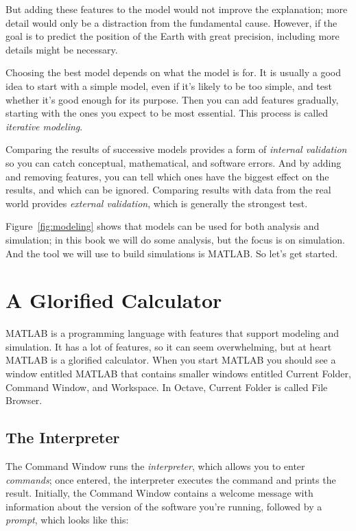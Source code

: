 But adding these features to the model would not improve the explanation; more detail would only be a distraction from the fundamental cause.  However, if the goal is to predict the position of the Earth with great precision, including more details might be necessary.

Choosing the best model depends on what the model is for.  It is usually a good idea to start with a simple model, even if it's likely to be too simple, and test whether it's good enough for its purpose.  Then you can add features gradually, starting with the ones you expect to be most essential.  This process is called \emph{iterative modeling}.


Comparing the results of successive models provides a form of \emph{internal  validation} so you can catch conceptual, mathematical, and software errors.  And by adding and removing features, you can tell which ones have the biggest effect on the results, and which can be ignored.
%
%
%
%
Comparing results with data from the real world provides \emph{external validation}, which is generally the strongest test.

Figure~\ref{fig:modeling} shows that models can be used for both analysis and simulation; in this book we will do some analysis, but the focus is on simulation.  And the tool we will use to build simulations is MATLAB.  So let's get started.


\section{A Glorified Calculator}
\label{calc}

MATLAB is a programming language with features that support modeling and simulation.  It has a lot of features, so it can seem overwhelming, but at heart MATLAB is a glorified calculator.  When you start MATLAB you should see a window entitled MATLAB that contains smaller windows entitled Current Folder, Command Window, and Workspace.
In Octave, Current Folder is called File Browser.


\subsection{The Interpreter}
The Command Window runs the \emph{interpreter}, which allows you
to enter \emph{commands}; once entered, the interpreter executes the command and prints the
result.
Initially, the Command Window contains a welcome message with information
about the version of the software you're running, followed by a \emph{prompt}, which looks like this:

